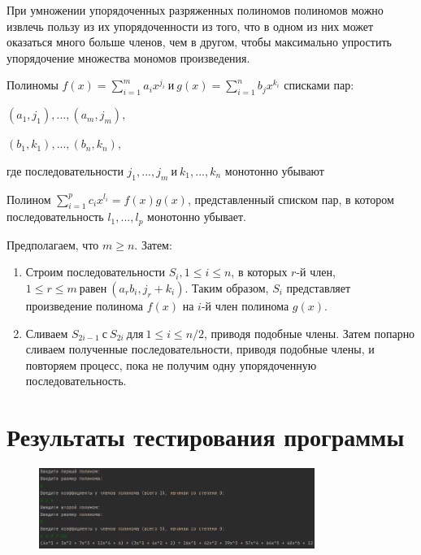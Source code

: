 \documentclass[bachelor, och, labwork]{shiza}
\begin{document}
При умножении упорядоченных разряженных полиномов полиномов можно извлечь пользу
из их упорядоченности из того, что в одном из них может оказаться много больше
членов, чем в другом, чтобы максимально упростить упорядочение множества мономов
произведения.

Полиномы $f(x)=\sum\limits_{i=1}^m{a_ix^{j_i}} ~\text{и}~ g(x)=\sum\limits_{i=1}^n{b_jx^{k_i}}$
списками пар: 
\begin{center} $(a_1,j_1),...,(a_m,j_m),$\end{center}
\begin{center} $(b_1,k_1),...,(b_n,k_n),$\end{center}
где последовательности $j_1,...,j_m ~\text{и}~ k_1,...,k_n$ монотонно убывают

Полином $\sum\limits_{i=1}^p{c_ix^{l_i}} = f(x)g(x)$, представленный списком пар,
в котором последовательность $l_1,...,l_p$ монотонно убывает.

Предполагаем, что $m \ge n$. Затем:
\begin{enumerate}
    
    \item Строим последовательности $S_i,1 \le i \le n$, в которых $r$-й член,
    $1 \le r \le m ~\text{равен}~ (a_rb_i, j_r + k_i)$. Таким образом, $S_i$
    представляет произведение полинома $f(x)$ на $i$-й член полинома $g(x)$.

    \item Сливаем $S_{2i-1} ~\text{с}~ S_{2i} ~\text{для}~ 1\le i \le n/2$,
          приводя подобные члены. Затем попарно сливаем полученные 
          последовательности, приводя подобные члены, и повторяем процесс, пока 
          не получим одну упорядоченную последовательность.

\end{enumerate}

\section{Результаты тестирования программы}

        \begin{figure}[H]
            \centering
            \includegraphics[width=0.8\textwidth]{2.png}
            \caption{}
        \end{figure}
\end{document}
